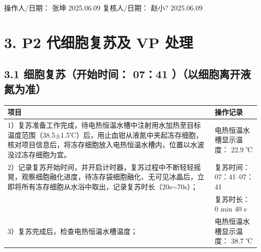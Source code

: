 \documentclass[UTF8,10pt,a4paper,fontset=fandol]{ctexart}
\newcommand{\fieldvalue}[1]{#1}
\newcommand{\handwritten}[1]{#1}
\begin{document}
操作人/日期：
\fieldvalue{\handwritten{张坤}}
\quad
\fieldvalue{\handwritten{2025.06.09}}
\hfill
复核人/日期：
\fieldvalue{\handwritten{赵小?}}
\quad
\fieldvalue{\handwritten{2025.06.09}}

\section*{3. P2 代细胞复苏及 VP 处理}

\subsection*{3.1 细胞复苏（开始时间：
\fieldvalue{\handwritten{07：41}}
）（以细胞离开液氮为准）}

\begin{tabularx}{\textwidth}{|p{}|X|}
\hline
\centering 项目 & \centering 操作记录 \tabularnewline
\hline
1）复苏准备工作完成，待电热恒温水槽中注射用水加热至目标温度范围（38.5$\pm$1.5℃）后，用止血钳从液氮中夹起冻存细胞，核对项目信息后，将冻存细胞放入电热恒温水槽内，位置以水波没过冻存细胞为宜。 &
电热恒温水槽显示温度：
\fieldvalue{\handwritten{22.9}} ℃\\
\hline
2）记录复苏开始时间，并开启计时器，复苏过程中不断轻轻摇晃，观察细胞融化进度，待冻存袋细胞融化、无可见冰晶后，立即将所有冻存细胞从水浴中取出，记录复苏时长（20s$\sim$70s）； &
复苏时间：
\fieldvalue{\handwritten{07：41--07：41}}\\
&
复苏时长：
\fieldvalue{\handwritten{0 min 40 s}}\\
\hline
3）复苏完成后，检查电热恒温水槽温度； &
电热恒温水槽显示温度：
\fieldvalue{\handwritten{38.7}} ℃\\
\hline
\end{tabularx}
\end{document}
